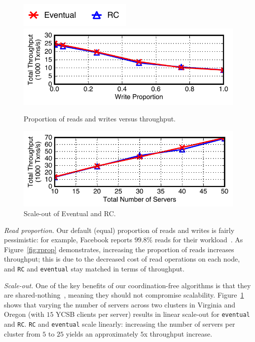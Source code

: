 \begin{figure}[t!]
\includegraphics[width=.33\columnwidth]{figs/strategylegendtwo.pdf}\vspace{-1.5em}
\begin{center}
\includegraphics[width=\figscale\columnwidth]{figs/finals/wprop-thru.pdf}
\end{center}
\caption{Proportion of reads and writes versus throughput.}
\label{fig:rprop}
\begin{center}
\includegraphics[width=\figscale\columnwidth]{figs/finals/scaleout-thru.pdf}
\end{center}
\caption{Scale-out of Eventual and RC.}
\label{fig:scaleout}
\end{figure}

\vspace{.5em}\noindent\textit{Read proportion.} Our default (equal)
proportion of reads and writes is fairly pessimistic: for example,
Facebook reports $99.8\%$ reads for their workload~\cite{eiger}. As
Figure~\ref{fig:rprop} demonstrates, increasing the proportion of
reads increases throughput; this is due to the decreased cost of read
operations on each node, and \texttt{RC} and \texttt{eventual} stay
matched in terms of throughput.

\vspace{.5em}\noindent\textit{Scale-out.} One of the key benefits of
our coordination-free algorithms is that they are shared-nothing~\cite{stonebraker-case}, meaning they
should not compromise scalability. Figure~\ref{fig:scaleout} shows
that varying the number of servers across two clusters in Virginia and
Oregon (with $15$ YCSB clients per server) results in linear scale-out
for \texttt{eventual} and \texttt{RC}. \texttt{RC} and
\texttt{eventual} scale linearly: increasing the number of servers per
cluster from $5$ to $25$ yields an approximately $5$x throughput
increase.

